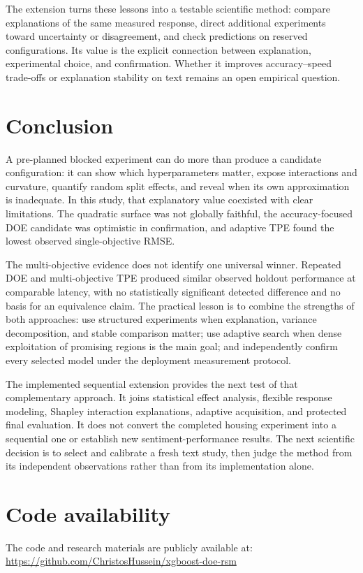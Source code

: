 \documentclass[12pt,a4paper]{article}
\begin{document}
The extension turns these lessons into a testable scientific method: compare explanations of the same measured response, direct additional experiments toward uncertainty or disagreement, and check predictions on reserved configurations. Its value is the explicit connection between explanation, experimental choice, and confirmation. Whether it improves accuracy--speed trade-offs or explanation stability on text remains an open empirical question.

\section{Conclusion}
A pre-planned blocked experiment can do more than produce a candidate configuration: it can show which hyperparameters matter, expose interactions and curvature, quantify random split effects, and reveal when its own approximation is inadequate. In this study, that explanatory value coexisted with clear limitations. The quadratic surface was not globally faithful, the accuracy-focused DOE candidate was optimistic in confirmation, and adaptive TPE found the lowest observed single-objective RMSE.

The multi-objective evidence does not identify one universal winner. Repeated DOE and multi-objective TPE produced similar observed holdout performance at comparable latency, with no statistically significant detected difference and no basis for an equivalence claim. The practical lesson is to combine the strengths of both approaches: use structured experiments when explanation, variance decomposition, and stable comparison matter; use adaptive search when dense exploitation of promising regions is the main goal; and independently confirm every selected model under the deployment measurement protocol.

The implemented sequential extension provides the next test of that complementary approach. It joins statistical effect analysis, flexible response modeling, Shapley interaction explanations, adaptive acquisition, and protected final evaluation. It does not convert the completed housing experiment into a sequential one or establish new sentiment-performance results. The next scientific decision is to select and calibrate a fresh text study, then judge the method from its independent observations rather than from its implementation alone.

\section{Code availability}
The code and research materials are publicly available at: \url{https://github.com/ChristosHussein/xgboost-doe-rsm}
\end{document}
